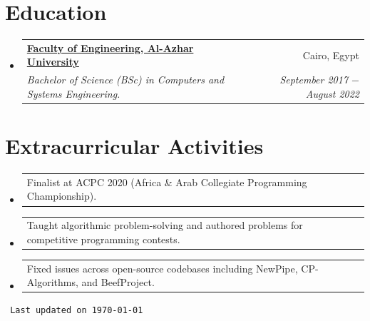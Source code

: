 \documentclass[letterpaper, 11pt]{article}
\makeatletter
\newcommand{\education}[6] {
	\vspace{-1pt}\item[]
  \begin{tabular*}{1\textwidth}[t]{l@{\extracolsep{\fill}}r}
		#1 \href{#2}{\textbf{\color{RoyalBlue}#3}} & #4 \\
    \textit{\small #5} & \textit{\small #6} \\
  \end{tabular*}
  \vspace{-4pt}
}
\newcommand{\extracurricularactivity}[3] {
	\vspace{1pt}\item
  \begin{tabular*}{0.97\textwidth}[t]{l@{\extracolsep{\fill}}r}
		#1 & \href{#2}{\color{RoyalBlue}#3} \\
  \end{tabular*}
  \vspace{-4pt}
}
\makeatother
\begin{document}
\section{Education}
\begin{itemize}[leftmargin=0pt]
  \education
  {\faIcon{university}}
	{https://eng-azhar.net/}
  {Faculty of Engineering, Al-Azhar University}{ Cairo, Egypt}
  {Bachelor of Science (BSc) in Computers and Systems Engineering.}{September 2017 $-$ August 2022}
\end{itemize}

\section{Extracurricular Activities}
\begin{itemize}[leftmargin=*]
  \extracurricularactivity
  {Finalist at ACPC 2020 (Africa \& Arab Collegiate Programming Championship).}
  {}{}

  \extracurricularactivity
  {Taught algorithmic problem-solving and authored problems for competitive programming contests.}
  {}{}

  \extracurricularactivity
  {Fixed issues across open-source codebases including NewPipe, CP-Algorithms, and BeefProject.}
  {}{}
\end{itemize}

\vfill
\begin{flushright}
	\texttt{\tiny
		\color{gray}
		Last updated on \today
	}
\end{flushright}
\end{document}
